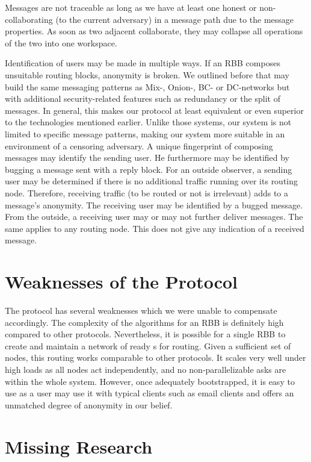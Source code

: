 Messages are not traceable as long as we have at least one honest or non-collaborating (to the current adversary) \VortexNode{} in a message path due to the message properties. As soon as two adjacent \VortexNodes{} collaborate, they may collapse all operations of the two into one workspace.

Identification of \MessageVortex{} users may be made in multiple ways. If an RBB composes unsuitable routing blocks, anonymity is broken. We outlined before that \MessageVortex{} may build the same messaging patterns as Mix-, Onion-, BC- or DC-networks but with additional security-related features such as redundancy or the split of messages. In general, this makes our protocol at least equivalent or even superior to the technologies mentioned earlier. Unlike those systems, our system is not limited to specific message patterns, making our system more suitable in an environment of a censoring adversary. A unique fingerprint of composing messages may identify the sending user. He furthermore may be identified by bugging a message sent with a reply block. For an outside observer, a sending user may be determined if there is no additional traffic running over its routing node. Therefore, receiving traffic (to be routed or not is irrelevant) adds to a message's anonymity. The receiving user may be identified by a bugged message. From the outside, a receiving user may or may not further deliver messages. The same applies to any routing node. This does not give any indication of a received message.

\chapter{Weaknesses of the Protocol}
The protocol has several weaknesses which we were unable to compensate accordingly. The complexity of the algorithms for an RBB is definitely high compared to other protocols. Nevertheless, it is possible for a single RBB to create and maintain a network of ready s for routing. Given a sufficient set of nodes, this routing works comparable to other protocols. It scales very well under high loads as all nodes act independently, and no non-parallelizable asks are within the whole system. However, once adequately bootstrapped, it is easy to use as a user may use it with typical clients such as email clients and offers an unmatched degree of anonymity in our belief.

\chapter{Missing Research}


